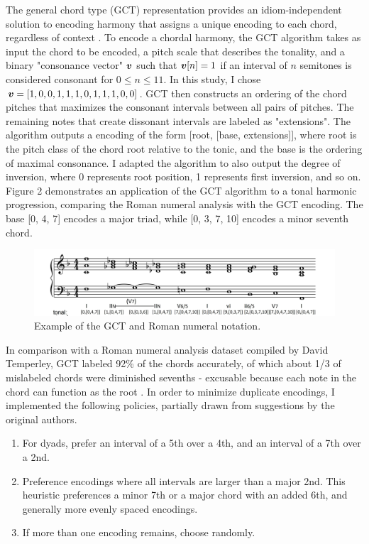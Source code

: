 \documentclass[11pt]{article}
\begin{document}
The general chord type (GCT) representation provides an idiom-independent solution to encoding harmony that assigns a unique encoding to each chord, regardless of context \citep{2014gct}. To encode a chordal harmony, the GCT algorithm takes as input the chord to be encoded, a pitch scale that describes the tonality, and a binary "consonance vector" $\boldsymbol{v}$ such that $\boldsymbol{v}[n] = 1$ if an interval of $n$ semitones is considered consonant for $0 \leq n \leq 11$. In this study, I chose $\boldsymbol{v} = [1, 0, 0, 1, 1, 1, 0, 1, 1, 1, 0, 0]$.  GCT then constructs an ordering of the chord pitches that maximizes the consonant intervals between all pairs of pitches. The remaining notes that create dissonant intervals are labeled as "extensions". The algorithm outputs a encoding of the form [root, [base, extensions]], where root is the pitch class of the chord root relative to the tonic, and the base is the ordering of maximal consonance. I adapted the algorithm to also output the degree of inversion, where 0 represents root position, 1 represents first inversion, and so on. Figure 2 demonstrates an application of the GCT algorithm to a tonal harmonic progression, comparing the Roman numeral analysis with the GCT encoding. The base [0, 4, 7] encodes a major triad, while [0, 3, 7, 10] encodes a minor seventh chord.

\begin{figure}[h]
\begin{center}
\caption{Example of the GCT and Roman numeral notation.}
\includegraphics[scale=0.7]{GCT}
\end{center}
\end{figure}

In comparison with a Roman numeral analysis dataset compiled by David Temperley, GCT labeled 92\% of the chords accurately, of which about 1/3 of mislabeled chords were diminished sevenths - excusable because each note in the chord can function as the root \citep{2014gct}. In order to minimize duplicate encodings, I implemented the following policies, partially drawn from suggestions by the original authors.
\begin{enumerate}
\item For dyads, prefer an interval of a 5th over a 4th, and an interval of a 7th over a 2nd.
\item Preference encodings where all intervals are larger than a major 2nd. This heuristic preferences a minor 7th or a major chord with an added 6th, and generally more evenly spaced encodings.
\item If more than one encoding remains, choose randomly.
\end{enumerate}
\end{document}
